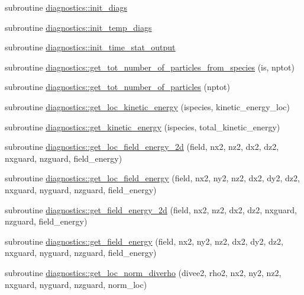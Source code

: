 \begin{DoxyCompactItemize}
subroutine \hyperlink{namespacediagnostics_a090bf3606a7c0c889195bd01b10adc5c}{diagnostics\+::init\+\_\+diags}
\item 
subroutine \hyperlink{namespacediagnostics_a111912cfff0906f9e78449119c1a3e43}{diagnostics\+::init\+\_\+temp\+\_\+diags}
\item 
subroutine \hyperlink{namespacediagnostics_a3ccd1d3efa537c9c73cbca0141184c32}{diagnostics\+::init\+\_\+time\+\_\+stat\+\_\+output}
\item 
subroutine \hyperlink{namespacediagnostics_a00e54b5beba626e955d8e3e946962f1d}{diagnostics\+::get\+\_\+tot\+\_\+number\+\_\+of\+\_\+particles\+\_\+from\+\_\+species} (is, nptot)
\item 
subroutine \hyperlink{namespacediagnostics_ab628191e427157162f167691267d0d1f}{diagnostics\+::get\+\_\+tot\+\_\+number\+\_\+of\+\_\+particles} (nptot)
\item 
subroutine \hyperlink{namespacediagnostics_addf30cc7cc0a935993be10cbf8b017f5}{diagnostics\+::get\+\_\+loc\+\_\+kinetic\+\_\+energy} (ispecies, kinetic\+\_\+energy\+\_\+loc)
\item 
subroutine \hyperlink{namespacediagnostics_ab51517b8d0751b8e43e0ab3c9338af41}{diagnostics\+::get\+\_\+kinetic\+\_\+energy} (ispecies, total\+\_\+kinetic\+\_\+energy)
\item 
subroutine \hyperlink{namespacediagnostics_a26be0942bfb3d70876815b6e121dec1c}{diagnostics\+::get\+\_\+loc\+\_\+field\+\_\+energy\+\_\+2d} (field, nx2, nz2, dx2, dz2, nxguard, nzguard, field\+\_\+energy)
\item 
subroutine \hyperlink{namespacediagnostics_a00b7e2217883d1cfe260ccc24e740663}{diagnostics\+::get\+\_\+loc\+\_\+field\+\_\+energy} (field, nx2, ny2, nz2, dx2, dy2, dz2, nxguard, nyguard, nzguard, field\+\_\+energy)
\item 
subroutine \hyperlink{namespacediagnostics_a35743d1121d2d5381a758ad94085362e}{diagnostics\+::get\+\_\+field\+\_\+energy\+\_\+2d} (field, nx2, nz2, dx2, dz2, nxguard, nzguard, field\+\_\+energy)
\item 
subroutine \hyperlink{namespacediagnostics_ac039b5b8f68cf780a761ee735024fe56}{diagnostics\+::get\+\_\+field\+\_\+energy} (field, nx2, ny2, nz2, dx2, dy2, dz2, nxguard, nyguard, nzguard, field\+\_\+energy)
\item 
subroutine \hyperlink{namespacediagnostics_a1a35a5a833c5e6c91cf6bc2f3d371d6a}{diagnostics\+::get\+\_\+loc\+\_\+norm\+\_\+diverho} (divee2, rho2, nx2, ny2, nz2, nxguard, nyguard, nzguard, norm\+\_\+loc)
\item 

\end{DoxyCompactItemize}
